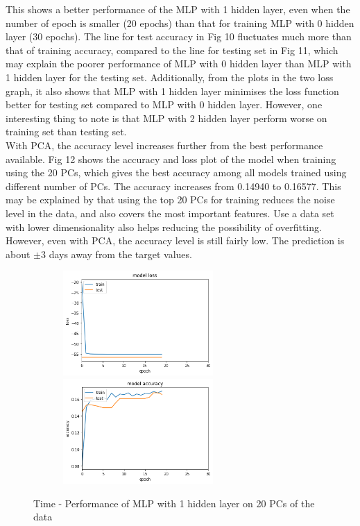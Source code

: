 \documentclass[letterpaper, 12 pt, conference]{ieeeconf}  %
\begin{document}
This shows a better performance of the MLP with 1 hidden layer, even when the number of epoch is smaller (20 epochs) than that for training MLP with 0 hidden layer (30 epochs).  The line for test accuracy in Fig 10 fluctuates much more than that of training accuracy, compared to the line for testing set in Fig 11, which may explain the poorer performance of MLP with 0 hidden layer than MLP with 1 hidden layer for the testing set. Additionally, from the plots in the two loss graph, it also shows that MLP with 1 hidden layer minimises the loss function better for testing set compared to MLP with 0 hidden layer. However, one interesting thing to note is that MLP with 2 hidden layer perform worse on training set than testing set. \\\newline
With PCA, the accuracy level increases further from the best performance available. Fig 12 shows the accuracy and loss plot of the model when training using the 20 PCs, which gives the best accuracy among all models trained using different number of PCs. The accuracy increases from 0.14940 to 0.16577. This may be explained by that using the top 20 PCs for training reduces the noise level in the data, and also covers the most important features. Use a data set with lower dimensionality also helps reducing the possibility of overfitting.\\\newline
However, even with PCA, the accuracy level is still fairly low. The prediction is about $\pm3$ days away from the target values. 
\begin{figure}[h]
	\includegraphics[width=8cm, height=4cm]{./figs/mlp-loss_20.png}\\
		\includegraphics[width=8cm, height=4cm]{./figs/mlp-accuracy_20.png}\\
	\caption{Time - Performance of MLP with 1 hidden layer on 20 PCs of the data}
	\label{fig:boat1}
\end{figure}\\
\end{document}
